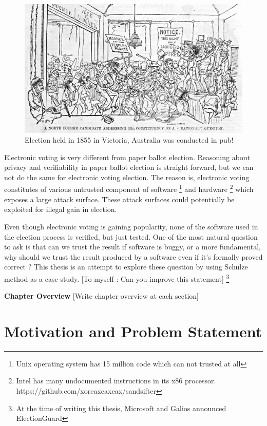  
 \begin{figure}[htb]
	\begin{center}
	\includegraphics[scale=0.25]{NorthBourke.jpg}
	\caption{Election held in 1855 in Victoria, Australia 
	  was conducted in pub!}
	\end{center}
  \end{figure}   
  
 Electronic voting is very different from paper ballot election. 
 Reasoning 
 about privacy and verifiability in paper ballot election 
 is straight forward, but we can not do the same for 
 electronic voting election. The reason is, electronic voting constitutes 
 of various untrusted component of software
 \footnote{Unix operating system has 15 million code which can not 
 trusted at all} and hardware
 \footnote{Intel has many undocumented instructions in its x86 
 processor. https://github.com/xoreaxeaxeax/sandsifter} which 
 exposes a large attack surface. These attack surfaces could 
 potentially be exploited for illegal gain in election. 
 
 Even though electronic voting is gaining popularity, none of 
 the software used in the election process is verified, but just
 tested. One of the most natural question to ask is that 
 can we trust the result if software is buggy, or a more fundamental, 
 why should we trust the result produced by a software even 
 if it's formally proved correct ? This thesis is an attempt to 
 explore these question by using Schulze method as a case study.
 [To myself : Can you improve this statement]   
 \footnote{At the time of writing this thesis, Microsoft and Galios 
  announced ElectionGuard}
   
 
\textbf{Chapter Overview}
[Write chapter overview at each section]


\section{Motivation and Problem Statement}
	      
